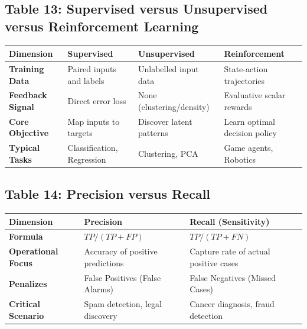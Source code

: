 \subsection*{Table 13: Supervised versus Unsupervised versus Reinforcement Learning}
\begin{center}
\small
\begin{tabularx}{\textwidth}{lXXX}
\toprule
\textbf{Dimension} & \textbf{Supervised} & \textbf{Unsupervised} & \textbf{Reinforcement} \\
\midrule
\textbf{Training Data} & Paired inputs and labels & Unlabelled input data & State-action trajectories \\
\textbf{Feedback Signal} & Direct error loss & None (clustering/density) & Evaluative scalar rewards \\
\textbf{Core Objective} & Map inputs to targets & Discover latent patterns & Learn optimal decision policy \\
\textbf{Typical Tasks} & Classification, Regression & Clustering, PCA & Game agents, Robotics \\
\bottomrule
\end{tabularx}
\end{center}

\subsection*{Table 14: Precision versus Recall}
\begin{center}
\small
\begin{tabularx}{\textwidth}{lXX}
\toprule
\textbf{Dimension} & \textbf{Precision} & \textbf{Recall (Sensitivity)} \\
\midrule
\textbf{Formula} & $TP / (TP + FP)$ & $TP / (TP + FN)$ \\
\textbf{Operational Focus} & Accuracy of positive predictions & Capture rate of actual positive cases \\
\textbf{Penalizes} & False Positives (False Alarms) & False Negatives (Missed Cases) \\
\textbf{Critical Scenario} & Spam detection, legal discovery & Cancer diagnosis, fraud detection \\
\bottomrule
\end{tabularx}
\end{center}

